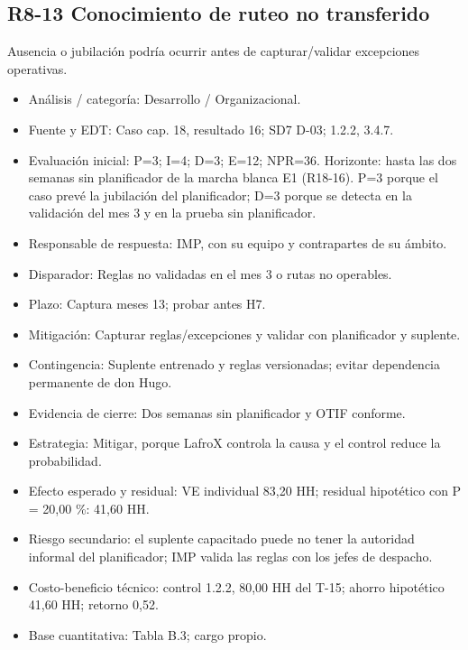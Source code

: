 \subsection*{R8-13 \textemdash{} Conocimiento de ruteo no transferido}

Ausencia o jubilación podría ocurrir antes de capturar/validar excepciones operativas.

\begin{itemize}[leftmargin=*,itemsep=3pt]
\item Análisis / categoría: Desarrollo / Organizacional.
\item Fuente y EDT: Caso cap. 18, resultado 16; SD7 D-03; 1.2.2, 3.4.7.
\item Evaluación inicial: P=3; I=4; D=3; E=12; NPR=36. Horizonte: hasta las dos semanas sin planificador de la marcha blanca E1 (R18-16). P=3 porque el caso prevé la jubilación del planificador; D=3 porque se detecta en la validación del mes 3 y en la prueba sin planificador.
\item Responsable de respuesta: IMP, con su equipo y contrapartes de su ámbito.
\item Disparador: Reglas no validadas en el mes 3 o rutas no operables.
\item Plazo: Captura meses 1\textendash{}3; probar antes H7.
\item Mitigación: Capturar reglas/excepciones y validar con planificador y suplente.
\item Contingencia: Suplente entrenado y reglas versionadas; evitar dependencia permanente de don Hugo.
\item Evidencia de cierre: Dos semanas sin planificador y OTIF conforme.
\item Estrategia: Mitigar, porque LafroX controla la causa y el control reduce la probabilidad.
\item Efecto esperado y residual: VE individual 83,20 HH; residual hipotético con P = 20,00 \%: 41,60 HH.
\item Riesgo secundario: el suplente capacitado puede no tener la autoridad informal del planificador; IMP valida las reglas con los jefes de despacho.
\item Costo-beneficio técnico: control 1.2.2, 80,00 HH del T-15; ahorro hipotético 41,60 HH; retorno 0,52.
\item Base cuantitativa: Tabla B.3; cargo propio.
\end{itemize}

